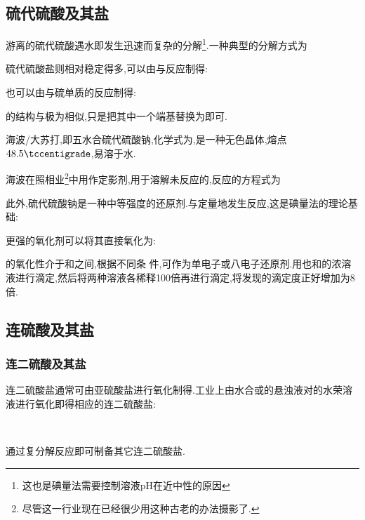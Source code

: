 \documentclass{ctexart}
\begin{document}
\subsection{硫代硫酸及其盐}
游离的硫代硫酸遇水即发生迅速而复杂的分解\footnote{这也是碘量法需要控制溶液pH在近中性的原因}.一种典型的分解方式为
\begin{center}
\end{center}
硫代硫酸盐则相对稳定得多,可以由与反应制得:
\begin{center}
\end{center}
也可以由与硫单质的反应制得:
\begin{center}
\end{center}
\indent {}的结构与极为相似,只是把其中一个端基替换为即可.
\begin{substance}[\ce{Na2S2O3.5H2O}]
    海波/大苏打,即五水合硫代硫酸钠,化学式为,是一种无色晶体,熔点$48.5\tccentigrade$,易溶于水.
\end{substance}
海波在照相业\footnote{尽管这一行业现在已经很少用这种古老的办法摄影了.}中用作定影剂,用于溶解未反应的,反应的方程式为
\begin{center}
\end{center}
此外,硫代硫酸钠是一种中等强度的还原剂.与定量地发生反应,这是碘量法的理论基础:
\begin{center}
\end{center}
更强的氧化剂可以将其直接氧化为:
\begin{center}
\end{center}
的氧化性介于和之间,根据不同条
件,可作为单电子或八电子还原剂.用也和的浓溶液进行滴定,然后将两种溶液各稀释100倍再进行滴定,将发现的滴定度正好增加为8倍.
\subsection{连硫酸及其盐}
\subsubsection{连二硫酸及其盐}
连二硫酸盐通常可由亚硫酸盐进行氧化制得.工业上由水合或的悬浊液对的水荣溶液进行氧化即得相应的连二硫酸盐:
\begin{center}
    \\
\end{center}
通过复分解反应即可制备其它连二硫酸盐.
\end{document}
